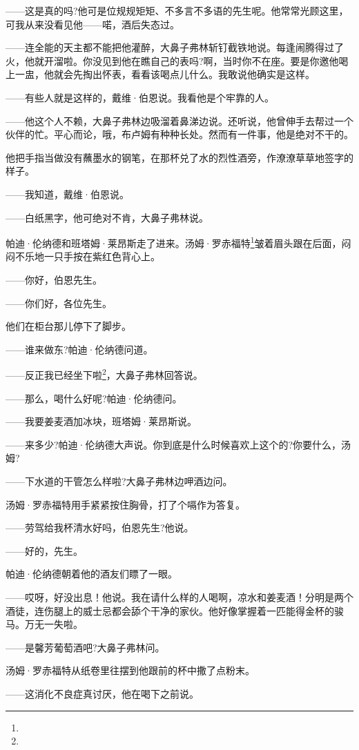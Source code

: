 \par ——这是真的吗?他可是位规规矩矩、不多言不多语的先生呢。他常常光顾这里，可我从来没看见他——喏，酒后失态过。
\par ——连全能的天主都不能把他灌醉，大鼻子弗林斩钉截铁地说。每逢闹腾得过了火，他就开溜啦。你没见到他在瞧自己的表吗?啊，当时你不在座。要是你邀他喝上一盅，他就会先掏出怀表，看看该喝点儿什么。我敢说他确实是这样。
\par ——有些人就是这样的，戴维·伯恩说。我看他是个牢靠的人。
\par ——他这个人不赖，大鼻子弗林边吸溜着鼻涕边说。还听说，他曾伸手去帮过一个伙伴的忙。平心而论，哦，布卢姆有种种长处。然而有一件事，他是绝对不干的。
\par 他把手指当做没有蘸墨水的钢笔，在那杯兑了水的烈性酒旁，作潦潦草草地签字的样子。
\par ——我知道，戴维·伯恩说。
\par ——白纸黑字，他可绝对不肯，大鼻子弗林说。
\par 帕迪·伦纳德和班塔姆·莱昂斯走了进来。汤姆·罗赤福特\footnote{}皱着眉头跟在后面，闷闷不乐地一只手按在紫红色背心上。
\par ——你好，伯恩先生。
\par ——你们好，各位先生。
\par 他们在柜台那儿停下了脚步。
\par ——谁来做东?帕迪·伦纳德问道。
\par ——反正我已经坐下啦\footnote{}，大鼻子弗林回答说。
\par ——那么，喝什么好呢?帕迪·伦纳德问。
\par ——我要姜麦酒加冰块，班塔姆·莱昂斯说。
\par ——来多少?帕迪·伦纳德大声说。你到底是什么时候喜欢上这个的?你要什么，汤姆?
\par ——下水道的干管怎么样啦?大鼻子弗林边呷酒边问。
\par 汤姆·罗赤福特用手紧紧按住胸骨，打了个嗝作为答复。
\par ——劳驾给我杯清水好吗，伯恩先生?他说。
\par ——好的，先生。
\par 帕迪·伦纳德朝着他的酒友们瞟了一眼。
\par ——哎呀，好没出息！他说。我在请什么样的人喝啊，凉水和姜麦酒！分明是两个酒徒，连伤腿上的威士忌都会舔个干净的家伙。他好像掌握着一匹能得金杯的骏马。万无一失啦。
\par ——是馨芳葡萄酒吧?大鼻子弗林问。
\par 汤姆·罗赤福特从纸卷里往摆到他跟前的杯中撒了点粉末。
\par ——这消化不良症真讨厌，他在喝下之前说。
